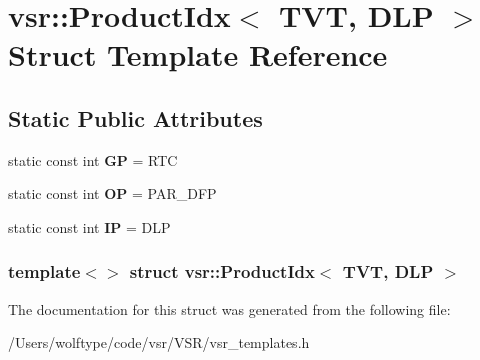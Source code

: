 \hypertarget{structvsr_1_1_product_idx_3_01_t_v_t_00_01_d_l_p_01_4}{\section{vsr\-:\-:Product\-Idx$<$ T\-V\-T, D\-L\-P $>$ Struct Template Reference}
\label{structvsr_1_1_product_idx_3_01_t_v_t_00_01_d_l_p_01_4}
}
\subsection*{Static Public Attributes}
\begin{DoxyCompactItemize}
\item 
\hypertarget{structvsr_1_1_product_idx_3_01_t_v_t_00_01_d_l_p_01_4_a924e16e28fcd2f8f505efb76bc98f612}{static const int {\bfseries G\-P} = R\-T\-C}\label{structvsr_1_1_product_idx_3_01_t_v_t_00_01_d_l_p_01_4_a924e16e28fcd2f8f505efb76bc98f612}

\item 
\hypertarget{structvsr_1_1_product_idx_3_01_t_v_t_00_01_d_l_p_01_4_ad698750d0c2fa7b3ff0ddb7fe3d13b31}{static const int {\bfseries O\-P} = P\-A\-R\-\_\-\-D\-F\-P}\label{structvsr_1_1_product_idx_3_01_t_v_t_00_01_d_l_p_01_4_ad698750d0c2fa7b3ff0ddb7fe3d13b31}

\item 
\hypertarget{structvsr_1_1_product_idx_3_01_t_v_t_00_01_d_l_p_01_4_a494ee610db8ab66702915d3300b721c2}{static const int {\bfseries I\-P} = D\-L\-P}\label{structvsr_1_1_product_idx_3_01_t_v_t_00_01_d_l_p_01_4_a494ee610db8ab66702915d3300b721c2}

\end{DoxyCompactItemize}
\subsubsection*{template$<$$>$ struct vsr\-::\-Product\-Idx$<$ T\-V\-T, D\-L\-P $>$}



The documentation for this struct was generated from the following file\-:\begin{DoxyCompactItemize}
\item 
/\-Users/wolftype/code/vsr/\-V\-S\-R/vsr\-\_\-templates.\-h\end{DoxyCompactItemize}
